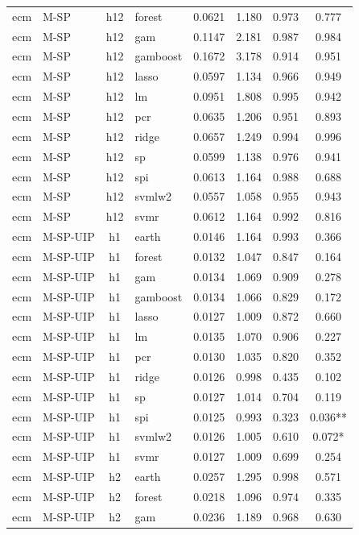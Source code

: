 \begin{ThreePartTable}
\begin{longtable}[t]{llclcccc}
ecm & M-SP & h12 & forest & 0.0621 & 1.180 & 0.973 & 0.777\\
ecm & M-SP & h12 & gam & 0.1147 & 2.181 & 0.987 & 0.984\\
ecm & M-SP & h12 & gamboost & 0.1672 & 3.178 & 0.914 & 0.951\\
ecm & M-SP & h12 & lasso & 0.0597 & 1.134 & 0.966 & 0.949\\
ecm & M-SP & h12 & lm & 0.0951 & 1.808 & 0.995 & 0.942\\
ecm & M-SP & h12 & pcr & 0.0635 & 1.206 & 0.951 & 0.893\\
ecm & M-SP & h12 & ridge & 0.0657 & 1.249 & 0.994 & 0.996\\
ecm & M-SP & h12 & sp & 0.0599 & 1.138 & 0.976 & 0.941\\
ecm & M-SP & h12 & spi & 0.0613 & 1.164 & 0.988 & 0.688\\
ecm & M-SP & h12 & svmlw2 & 0.0557 & 1.058 & 0.955 & 0.943\\
ecm & M-SP & h12 & svmr & 0.0612 & 1.164 & 0.992 & 0.816\\
\addlinespace
ecm & M-SP-UIP & h1 & earth & 0.0146 & 1.164 & 0.993 & 0.366\\
ecm & M-SP-UIP & h1 & forest & 0.0132 & 1.047 & 0.847 & 0.164\\
ecm & M-SP-UIP & h1 & gam & 0.0134 & 1.069 & 0.909 & 0.278\\
ecm & M-SP-UIP & h1 & gamboost & 0.0134 & 1.066 & 0.829 & 0.172\\
ecm & M-SP-UIP & h1 & lasso & 0.0127 & 1.009 & 0.872 & 0.660\\
ecm & M-SP-UIP & h1 & lm & 0.0135 & 1.070 & 0.906 & 0.227\\
ecm & M-SP-UIP & h1 & pcr & 0.0130 & 1.035 & 0.820 & 0.352\\
ecm & M-SP-UIP & h1 & ridge & 0.0126 & 0.998 & 0.435 & 0.102\\
ecm & M-SP-UIP & h1 & sp & 0.0127 & 1.014 & 0.704 & 0.119\\
ecm & M-SP-UIP & h1 & spi & 0.0125 & 0.993 & 0.323 & 0.036**\\
ecm & M-SP-UIP & h1 & svmlw2 & 0.0126 & 1.005 & 0.610 & 0.072*\\
ecm & M-SP-UIP & h1 & svmr & 0.0127 & 1.009 & 0.699 & 0.254\\
\addlinespace
ecm & M-SP-UIP & h2 & earth & 0.0257 & 1.295 & 0.998 & 0.571\\
ecm & M-SP-UIP & h2 & forest & 0.0218 & 1.096 & 0.974 & 0.335\\
ecm & M-SP-UIP & h2 & gam & 0.0236 & 1.189 & 0.968 & 0.630\\

\end{longtable}
\end{ThreePartTable}
